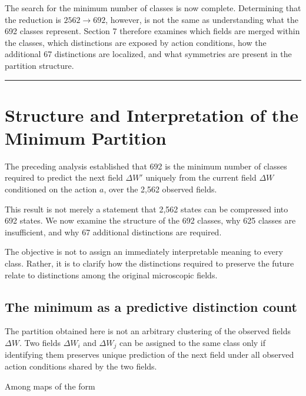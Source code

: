 \documentclass[
  11pt,
]{article}
\begin{document}
The search for the minimum number of classes is now complete.
Determining that the reduction is \({2562\to692}\), however, is not the
same as understanding what the 692 classes represent. Section 7
therefore examines which fields are merged within the classes, which
distinctions are exposed by action conditions, how the additional 67
distinctions are localized, and what symmetries are present in the
partition structure.

\begin{center}\rule{0.5\linewidth}{0.5pt}\end{center}

\hypertarget{structure-and-interpretation-of-the-minimum-partition}{%
\section{Structure and Interpretation of the Minimum
Partition}\label{structure-and-interpretation-of-the-minimum-partition}}

The preceding analysis established that 692 is the minimum number of
classes required to predict the next field \({\Delta W'}\) uniquely from
the current field \({\Delta W}\) conditioned on the action \({a}\), over
the 2,562 observed fields.

This result is not merely a statement that 2,562 states can be
compressed into 692 states. We now examine the structure of the 692
classes, why 625 classes are insufficient, and why 67 additional
distinctions are required.

The objective is not to assign an immediately interpretable meaning to
every class. Rather, it is to clarify how the distinctions required to
preserve the future relate to distinctions among the original
microscopic fields.

\hypertarget{the-minimum-as-a-predictive-distinction-count}{%
\subsection{The minimum as a predictive distinction
count}\label{the-minimum-as-a-predictive-distinction-count}}

The partition obtained here is not an arbitrary clustering of the
observed fields \({\Delta W}\). Two fields \({\Delta W_i}\) and
\({\Delta W_j}\) can be assigned to the same class only if identifying
them preserves unique prediction of the next field under all observed
action conditions shared by the two fields.

Among maps of the form
\end{document}
